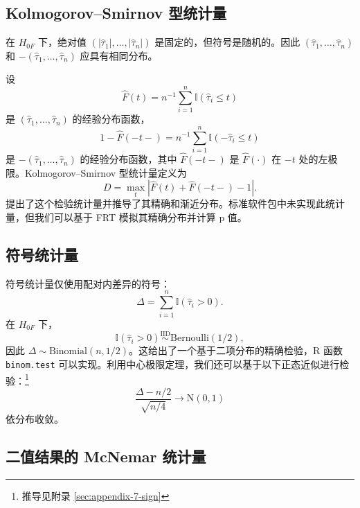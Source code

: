 \subsection{Kolmogorov--Smirnov 型统计量}\label{sec:7-ks}

\begin{Example}\label{ex:7-ks}
在 $H_{0F}$ 下，绝对值 $(|\hat\tau_1|, \dots, |\hat\tau_n|)$ 是固定的，但符号是随机的。因此 $(\hat\tau_1, \dots, \hat\tau_n)$ 和 $-(\hat\tau_1, \dots, \hat\tau_n)$ 应具有相同分布。

设
\[
\hat F(t) = n^{-1} \sum_{i=1}^n \mathbb{I}(\hat\tau_i \leq t)
\]
是 $(\hat\tau_1, \dots, \hat\tau_n)$ 的经验分布函数，
\[
1 - \hat F(-t-) = n^{-1} \sum_{i=1}^n \mathbb{I}(-\hat\tau_i \leq t)
\]
是 $-(\hat\tau_1, \dots, \hat\tau_n)$ 的经验分布函数，其中 $\hat F(-t-)$ 是 $\hat F(\cdot)$ 在 $-t$ 处的左极限。Kolmogorov--Smirnov 型统计量定义为
\begin{equation}
D = \max_t |\hat F(t) + \hat F(-t-) - 1|.
\label{eq:7-ks-statistic}
\end{equation}
\citet{Butler:1969} 提出了这个检验统计量并推导了其精确和渐近分布。标准软件包中未实现此统计量，但我们可以基于 FRT 模拟其精确分布并计算 p 值。
\end{Example}

\subsection{符号统计量}\label{sec:7-sign}

\begin{Example}[符号统计量]\label{ex:7-sign}
符号统计量仅使用配对内差异的符号：
\begin{equation}
\Delta = \sum_{i=1}^n \mathbb{I}(\hat\tau_i > 0).
\label{eq:7-sign-stat}
\end{equation}
在 $H_{0F}$ 下，
\[
\mathbb{I}(\hat\tau_i > 0) \stackrel{\text{IID}}{\sim} \text{Bernoulli}(1/2),
\]
因此 $\Delta \sim \text{Binomial}(n, 1/2)$。这给出了一个基于二项分布的精确检验，R 函数 \texttt{binom.test} 可以实现。利用中心极限定理，我们还可以基于以下正态近似进行检验：\footnote{推导见附录 \cref{sec:appendix-7-sign}}
\begin{equation}
\frac{\Delta - n/2}{\sqrt{n/4}} \to \mathrm{N}(0, 1)
\label{eq:7-sign-asymptotic}
\end{equation}
依分布收敛。
\end{Example}

\subsection{二值结果的 McNemar 统计量}\label{sec:7-mcnemar}

